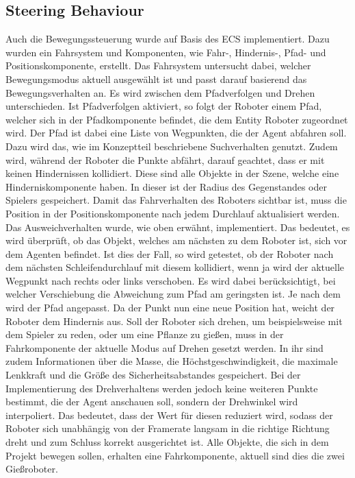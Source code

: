 \subsection{Steering Behaviour}
Auch die Bewegungssteuerung wurde auf Basis des ECS implementiert. Dazu wurden ein Fahrsystem und Komponenten, wie Fahr-, Hindernis-, Pfad- und Positionskomponente, erstellt. Das Fahrsystem untersucht dabei, welcher Bewegungsmodus aktuell ausgewählt ist und passt darauf basierend das Bewegungsverhalten an. Es wird zwischen dem Pfadverfolgen und Drehen unterschieden. Ist Pfadverfolgen aktiviert, so folgt der Roboter einem Pfad, welcher sich in der Pfadkomponente befindet, die dem Entity Roboter zugeordnet wird. Der Pfad ist dabei eine Liste von Wegpunkten, die der Agent abfahren soll. Dazu wird das, wie im Konzeptteil beschriebene Suchverhalten genutzt. Zudem wird, während der Roboter die Punkte abfährt, darauf geachtet, dass er mit keinen Hindernissen kollidiert. Diese sind alle Objekte in der Szene, welche eine Hinderniskomponente haben. In dieser ist der Radius des Gegenstandes oder Spielers gespeichert. Damit das Fahrverhalten des Roboters sichtbar ist, muss die Position in der Positionskomponente nach jedem Durchlauf aktualisiert werden. Das Ausweichverhalten wurde, wie oben erwähnt, implementiert. Das bedeutet, es wird überprüft, ob das Objekt, welches am nächsten zu dem Roboter ist, sich vor dem Agenten befindet. Ist dies der Fall, so wird getestet, ob der Roboter nach dem nächsten Schleifendurchlauf mit diesem kollidiert, wenn ja wird der aktuelle Wegpunkt nach rechts oder links verschoben. Es wird dabei berücksichtigt, bei welcher Verschiebung die Abweichung zum Pfad am geringsten ist. Je nach dem wird der Pfad angepasst. Da der Punkt nun eine neue Position hat, weicht der Roboter dem Hindernis aus.
Soll der Roboter sich drehen, um beispielsweise mit dem Spieler zu reden, oder um eine Pflanze zu gießen, muss in der Fahrkomponente der aktuelle Modus auf Drehen gesetzt werden. In ihr sind zudem Informationen über die Masse, die Höchstgeschwindigkeit, die maximale Lenkkraft und die Größe des Sicherheitsabstandes gespeichert. Bei der Implementierung des Drehverhaltens werden jedoch keine weiteren Punkte bestimmt, die der Agent anschauen soll, sondern der Drehwinkel wird interpoliert. Das bedeutet, dass der Wert für diesen reduziert wird, sodass der Roboter sich unabhängig von der Framerate langsam in die richtige Richtung dreht und zum Schluss korrekt ausgerichtet ist. Alle Objekte, die sich in dem Projekt bewegen sollen, erhalten eine Fahrkomponente, aktuell sind dies die zwei Gießroboter. 
